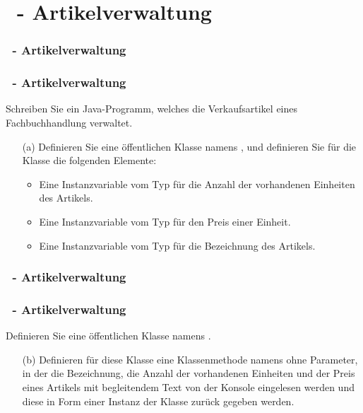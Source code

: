 \def\stitle{\theexercise\ - Artikelverwaltung}
\section{\stitle}
\begin{frame}%
  \frametitle{\stitle}%
\tableofcontents[current]
\end{frame}
\begin{frame}%
  \frametitle{\stitle}%
Schreiben Sie ein Java-Programm, welches die Verkaufsartikel eines Fachbuchhandlung verwaltet.

\begin{enumerate}
\item[(a)] Definieren Sie eine \"offentlichen Klasse namens , und definieren Sie für die Klasse die folgenden Elemente:
  \begin{itemize}
    \item Eine Instanzvariable  vom Typ  für die Anzahl der vorhandenen Einheiten des Artikels.
    \item Eine Instanzvariable  vom Typ  für den Preis einer Einheit.
    \item Eine Instanzvariable  vom Typ  für die Bezeichnung des Artikels.
  \end{itemize}
\end{enumerate}
\end{frame}


\begin{frame}%
  \frametitle{\stitle}%

\end{frame}


\begin{frame}%
  \frametitle{\stitle}%
Definieren Sie eine \"offentlichen Klasse namens .
\begin{enumerate}
\item[(b)]
  Definieren für diese Klasse eine Klassenmethode namens  ohne Parameter, in der die Bezeichnung, die Anzahl der vorhandenen Einheiten und der Preis eines Artikels mit begleitendem Text von der Konsole eingelesen werden und diese in Form einer Instanz der Klasse  zur\"uck gegeben werden.
\end{enumerate}
\pause

\end{frame}



